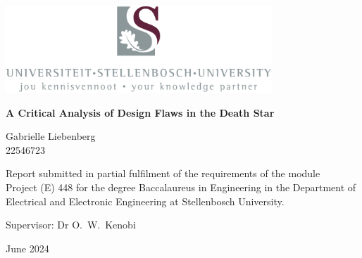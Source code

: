 \graphicspath{{frontmatter/fig/}}

\begin{titlepage}
	\begin{center}
		
		\includegraphics[width=10cm]{USlogo-top}
		
		\vfill
		
		{\sffamily \bfseries \huge A Critical Analysis of Design Flaws in the Death Star \par}
		
		\vfill
		
		{\large {\Large Gabrielle Liebenberg} \\ 22546723 \par}
		
		\vfill
		
		\vfill
		
		{Report submitted in partial fulfilment of the requirements of the module \\
			Project (E) 448 for the degree Baccalaureus in Engineering in the Department of
			Electrical and Electronic Engineering at Stellenbosch University. \par}
		
		\vfill
		
		{\large {Supervisor}: Dr O.\ W.\ Kenobi} %
		
		\vfill
		
		{\Large June 2024}
	\end{center}
\end{titlepage}
